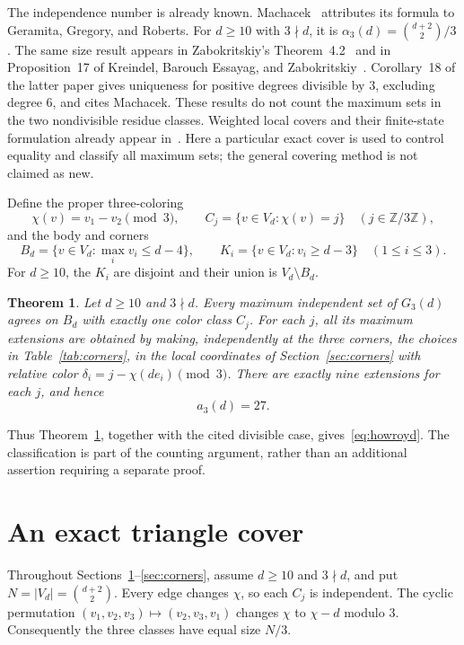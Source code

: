 \documentclass[11pt]{article}
\newtheorem{theorem}{Theorem}[section]
\newcommand{\Z}{\mathbb Z}
\begin{document}
The independence number is already known. Machacek~\cite[Section~2]{machacek}
attributes its formula to Geramita, Gregory, and Roberts.
For \(d\geq10\) with \(3\nmid d\), it is
\(\alpha_3(d)=\binom{d+2}{2}/3\).
The same size result appears in Zabokritskiy's
Theorem~4.2~\cite{covers} and in Proposition~17 of
Kreindel, Barouch Essayag, and Zabokritskiy~\cite{codes}.
Corollary~18 of the latter paper gives uniqueness for positive degrees
divisible by \(3\), excluding degree \(6\), and cites Machacek.
These results do not count the maximum sets in the two nondivisible
residue classes. Weighted local covers and their finite-state
formulation already appear in~\cite[Section~3]{covers}.
Here a particular exact cover is used to control equality and classify
all maximum sets; the general covering method is not claimed as new.

Define the proper three-coloring
\[
 \chi(v)=v_1-v_2\pmod3,\qquad
 C_j=\{v\in V_d:\chi(v)=j\}\quad(j\in\Z/3\Z),
\]
and the body and corners
\begin{equation}\label{eq:body-corners}
 B_d=\{v\in V_d:\max_i v_i\leq d-4\},\qquad
 K_i=\{v\in V_d:v_i\geq d-3\}\quad(1\leq i\leq3).
\end{equation}
For \(d\geq10\), the \(K_i\) are disjoint and their union is
\(V_d\setminus B_d\).

\begin{theorem}\label{thm:main}
Let \(d\geq10\) and \(3\nmid d\).
Every maximum independent set of \(G_3(d)\) agrees on \(B_d\) with
exactly one color class \(C_j\).
For each \(j\), all its maximum extensions are obtained by making,
independently at the three corners, the choices in
Table~\ref{tab:corners}, in the local coordinates of
Section~\ref{sec:corners} with relative color
\(\delta_i=j-\chi(de_i)\pmod3\).
There are exactly nine extensions for each \(j\), and hence
\[
 a_3(d)=27.
\]
\end{theorem}

Thus Theorem~\ref{thm:main}, together with the cited divisible case,
gives~\eqref{eq:howroyd}. The classification is part of the counting
argument, rather than an additional assertion requiring a separate
proof.

\section{An exact triangle cover}\label{sec:cover}

Throughout Sections~\ref{sec:cover}--\ref{sec:corners}, assume
\(d\geq10\) and \(3\nmid d\), and put \(N=|V_d|=\binom{d+2}{2}\).
Every edge changes \(\chi\), so each \(C_j\) is independent.
The cyclic permutation \((v_1,v_2,v_3)\mapsto(v_2,v_3,v_1)\)
changes \(\chi\) to \(\chi-d\) modulo \(3\).
Consequently the three classes have equal size \(N/3\).
\end{document}
